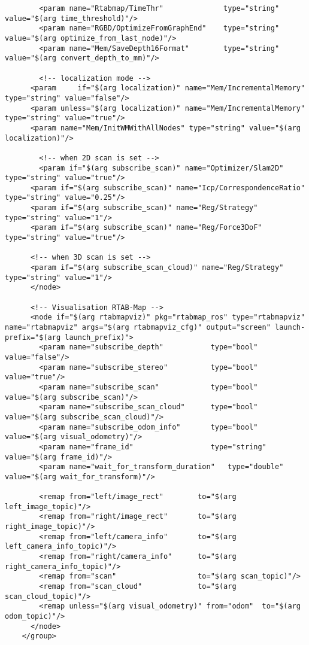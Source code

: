 \begin{center}
\begin{footnotesize}
\begin{verbatim}
        <param name="Rtabmap/TimeThr"              type="string" value="$(arg time_threshold)"/>
        <param name="RGBD/OptimizeFromGraphEnd"    type="string" value="$(arg optimize_from_last_node)"/>
        <param name="Mem/SaveDepth16Format"        type="string" value="$(arg convert_depth_to_mm)"/>
        
        <!-- localization mode -->
      <param     if="$(arg localization)" name="Mem/IncrementalMemory" type="string" value="false"/>
      <param unless="$(arg localization)" name="Mem/IncrementalMemory" type="string" value="true"/>
      <param name="Mem/InitWMWithAllNodes" type="string" value="$(arg localization)"/>

        <!-- when 2D scan is set -->
        <param if="$(arg subscribe_scan)" name="Optimizer/Slam2D"        type="string" value="true"/>
      <param if="$(arg subscribe_scan)" name="Icp/CorrespondenceRatio" type="string" value="0.25"/>
      <param if="$(arg subscribe_scan)" name="Reg/Strategy"            type="string" value="1"/> 
      <param if="$(arg subscribe_scan)" name="Reg/Force3DoF"           type="string" value="true"/>

      <!-- when 3D scan is set -->
      <param if="$(arg subscribe_scan_cloud)" name="Reg/Strategy"      type="string" value="1"/>
      </node>
    
      <!-- Visualisation RTAB-Map -->
      <node if="$(arg rtabmapviz)" pkg="rtabmap_ros" type="rtabmapviz" name="rtabmapviz" args="$(arg rtabmapviz_cfg)" output="screen" launch-prefix="$(arg launch_prefix)">
        <param name="subscribe_depth"           type="bool"   value="false"/>
        <param name="subscribe_stereo"          type="bool"   value="true"/>
        <param name="subscribe_scan"            type="bool"   value="$(arg subscribe_scan)"/>
        <param name="subscribe_scan_cloud"      type="bool"   value="$(arg subscribe_scan_cloud)"/>
        <param name="subscribe_odom_info"       type="bool"   value="$(arg visual_odometry)"/>
        <param name="frame_id"                  type="string" value="$(arg frame_id)"/>
        <param name="wait_for_transform_duration"   type="double"   value="$(arg wait_for_transform)"/>
      
        <remap from="left/image_rect"        to="$(arg left_image_topic)"/>
        <remap from="right/image_rect"       to="$(arg right_image_topic)"/>
        <remap from="left/camera_info"       to="$(arg left_camera_info_topic)"/>
        <remap from="right/camera_info"      to="$(arg right_camera_info_topic)"/>
        <remap from="scan"                   to="$(arg scan_topic)"/>
        <remap from="scan_cloud"             to="$(arg scan_cloud_topic)"/>
        <remap unless="$(arg visual_odometry)" from="odom"  to="$(arg odom_topic)"/>
      </node>
    </group>


\end{verbatim}
\end{footnotesize}
\end{center}
